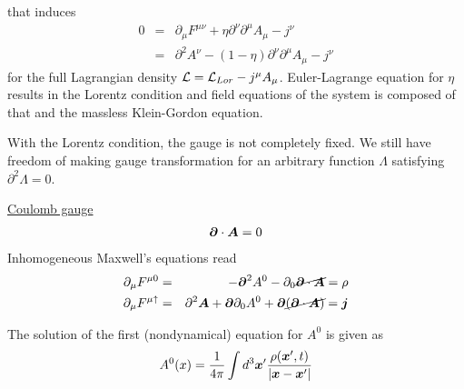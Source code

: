 that induces
\begin{eqnarray}
0
&=&
\partial_\mu F^{\mu \nu}
+ \eta \partial^\nu \partial^\mu A_\mu
- j^\nu
\nonumber\\
&=&
\partial^2 A^\nu
- (1 - \eta)
\partial^\nu \partial^\mu A_\mu
- j^\nu
\label{eqn:EOMwitheta}
\end{eqnarray}
for the full Lagrangian density ${\cal L} = {\cal L}_{Lor} - j^\mu A_\mu$.
Euler-Lagrange equation for $\eta$ results in the Lorentz condition and
field equations of the system is composed of that and the massless Klein-Gordon equation.

With the Lorentz condition, the gauge is not completely fixed. We still have freedom of
making gauge transformation for an arbitrary function $\Lambda$ satisfying 
$\partial^2 \Lambda = 0$.

\bigskip
\noindent
\underline{Coulomb gauge}\\
\begin{eqnarray}
\mbox{\boldmath $\partial$} \cdot \mbox{\boldmath $A$} = 0
\label{eqn:CoulmbGaugeCond}
\end{eqnarray}
Inhomogeneous Maxwell's equations read
\begin{eqnarray}
\partial_\mu F^{\mu 0} 
&=&
- \mbox{\boldmath $\partial$}^2 A^0 - \partial_0 
\cancel{
\mbox{\boldmath $\partial$}\cdot \mbox{\boldmath $A$}
}
= \rho
\label{eqn:CoulmbEOMrho}
\\
\partial_\mu F^{\mu \uparrow} 
&=&
\partial^2 \mbox{\boldmath $A$} + \mbox{\boldmath $\partial$}\partial_0 A^0 +
\mbox{\boldmath $\partial$}
\cancel{
 (\mbox{\boldmath $\partial$}\cdot \mbox{\boldmath $A$})
}
= \mbox{\boldmath $j$}
\label{eqn:CoulmbEOMj}
\end{eqnarray}
\begin{comment}
\begin{eqnarray}
\left\{
\begin{array}{l}
\partial_\mu F^{\mu 0} =
- \bld{\partial}^2 A^0 - \partial_0 
\cancel{
\bld{\partial}\cdot \bld{A}
}
= \rho
\\
\partial_\mu F^{\mu \uparrow} =
\partial^2 \bld{A} + \bld{\partial}\partial_0 A^0 +
\bld{\partial}
\cancel{
 (\bld{\partial}\cdot \bld{A})
}
= \bld{j}
\end{array}
\right.
\label{eqn:CoulmbEOMj}
\end{eqnarray}
\end{comment}
The solution of the first (nondynamical) equation for $A^0$ is given as
\begin{eqnarray}
A^0 (x) = \frac{1}{4\pi} \int d^3 \mbox{\boldmath $x$}' 
\frac{\rho(\mbox{\boldmath $x$}', t)}{| \mbox{\boldmath $x$} - \mbox{\boldmath $x$}' |}
\label{eqn:CoulmbA0}
\end{eqnarray}
